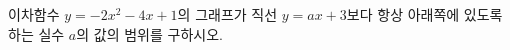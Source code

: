 \hspace*{2mm}\begin{minipage}[t]{\dimexpr\linewidth-2mm\relax}\vspace{0pt}
이차함수 $y=-2x^2-4x+1$의 그래프가 직선 $y=ax+3$보다 항상 아래쪽에 있도록 하는 실수 $a$의 값의 범위를 구하시오.\end{minipage}
